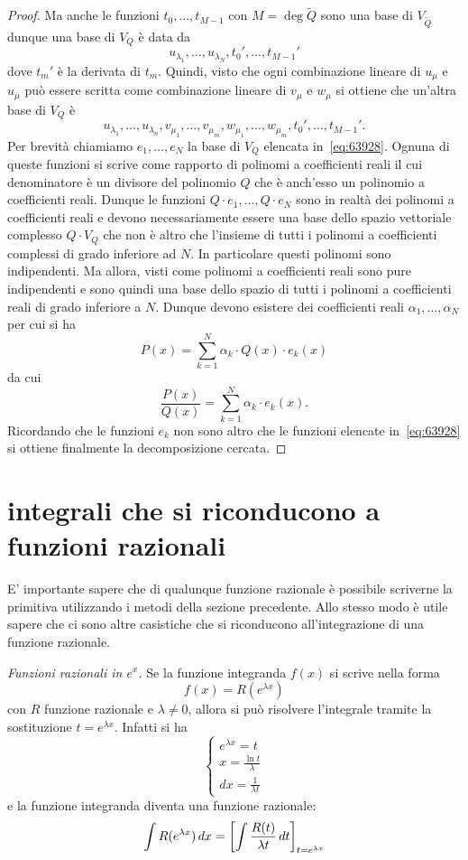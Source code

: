 \begin{proof}
Ma anche le funzioni $t_0, \dots, t_{M-1}$ con $M=\deg \tilde Q$
sono una base di $V_{\tilde Q}$ dunque una base
di $V_Q$ è data da
\[
  u_{\lambda_1}, \dots, u_{\lambda_N},
  t_0', \dots, t_{M-1}'
\]
dove $t_m'$ è la derivata di $t_m$.
Quindi, visto che ogni combinazione lineare
di $u_{\mu}$ e $u_{\bar \mu}$ può essere scritta
come combinazione lineare di $v_\mu$ e $w_\mu$
si ottiene che un'altra base di $V_Q$ è
\begin{equation}\label{eq:63928}
  u_{\lambda_1}, \dots, u_{\lambda_n},
  v_{\mu_1}, \dots, v_{\mu_m},
  w_{\mu_1}, \dots, w_{\mu_m},
  t_0', \dots, t_{M-1}'.
\end{equation}
Per brevità chiamiamo $e_1, \dots, e_N$
la base di $V_Q$ elencata in~\eqref{eq:63928}.
Ognuna di queste funzioni si scrive come
rapporto di polinomi a coefficienti reali
il cui denominatore è un divisore del polinomio $Q$
che è anch'esso un polinomio a coefficienti reali.
Dunque le funzioni $Q\cdot e_1, \dots, Q\cdot e_N$
sono in realtà dei polinomi a coefficienti reali
e devono necessariamente essere una base dello spazio
vettoriale complesso $Q\cdot V_Q$ che non è altro che l'insieme
di tutti i polinomi a coefficienti complessi
di grado inferiore ad $N$. In particolare questi polinomi
sono indipendenti.
Ma allora, visti come polinomi a
coefficienti reali sono pure indipendenti e sono quindi
una base dello spazio di tutti i polinomi a coefficienti reali
di grado inferiore a $N$.
Dunque devono esistere dei coefficienti reali $\alpha_1, \dots, \alpha_N$
per cui si ha
\[
  P(x) = \sum_{k=1}^N \alpha_k\cdot Q(x)\cdot e_k(x)
\]
da cui
\[
  \frac{P(x)}{Q(x)} = \sum_{k=1}^N \alpha_k \cdot e_k(x).
\]
Ricordando che le funzioni $e_k$ non sono altro che le funzioni
elencate in~\eqref{eq:63928} si ottiene finalmente la decomposizione
cercata.
\end{proof}

\section{integrali che si riconducono a funzioni razionali}

E' importante sapere che di qualunque funzione razionale è possibile
scriverne la primitiva utilizzando i metodi della sezione precedente.
Allo stesso modo è utile sapere che ci sono altre casistiche che si
riconducono all'integrazione di una funzione razionale.

\emph{Funzioni razionali in $e^x$.}
Se la funzione integranda $f(x)$ si scrive nella forma
\[
  f(x) = R(e^{\lambda x})
\]
con $R$ funzione razionale e $\lambda\neq 0$,
allora si può risolvere l'integrale tramite la
sostituzione $t = e^{\lambda x}$. Infatti si ha
\[
\begin{cases}
 e^{\lambda x} = t\\
 x = \frac{\ln t}{\lambda}\\
 dx = \frac{1}{\lambda t}
 \end{cases}
\]
e la funzione integranda diventa una funzione razionale:
\[
 \int R(e^{\lambda x})\, dx = {\left[ \int \frac{R(t)}{\lambda t}\, dt \right]}_{t=e^{\lambda x}}
\]

